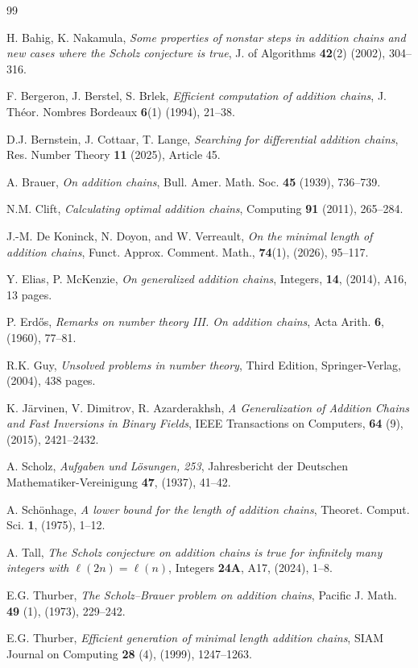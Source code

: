 \documentclass{article}
\theoremstyle{definition}
\begin{document}
\begin{thebibliography}{99}

 H. Bahig, K. Nakamula, {\sl Some properties of nonstar steps in addition chains and new cases where the Scholz conjecture is true}, J. of Algorithms {\bf 42}(2) (2002), 304--316.

F. Bergeron, J. Berstel, S. Brlek,
{\sl Efficient computation of addition chains},
J. Th\'eor. Nombres Bordeaux {\bf 6}(1) (1994), 21--38.

D.J. Bernstein, J. Cottaar, T. Lange,
{\sl Searching for differential addition chains},
Res. Number Theory {\bf 11} (2025), Article 45.

 A. Brauer, {\sl On addition chains}, Bull. Amer. Math. Soc. {\bf 45} (1939), 736--739.


 N.M. Clift, {\sl Calculating optimal addition chains}, Computing {\bf 91} (2011), 265--284.


 J.-M. De Koninck, N. Doyon, and W. Verreault, {\sl On the minimal length of addition chains}, Funct. Approx. Comment. Math., {\bf 74}(1), (2026), 95--117.


 Y. Elias, P. McKenzie, {\sl On generalized addition chains}, Integers, {\bf 14}, (2014), A16, 13 pages.


 P. Erd\H{o}s, {\sl Remarks on number theory III. On addition chains}, Acta Arith. {\bf 6}, (1960), 77--81.

 R.K. Guy, {\sl Unsolved problems in number theory}, Third Edition, Springer-Verlag, (2004), 438 pages.

 K. Järvinen, V. Dimitrov,  R. Azarderakhsh, {\sl A Generalization of Addition Chains and Fast Inversions in Binary Fields}, IEEE Transactions on Computers, {\bf 64} (9), (2015), 2421--2432.

 A. Scholz, {\sl Aufgaben und L\"osungen, 253}, Jahresbericht der Deutschen Mathematiker-Vereinigung {\bf 47}, (1937), 41--42.

 A. Sch\"onhage, {\sl A lower bound for the length of addition chains}, Theoret. Comput. Sci. {\bf 1}, (1975), 1--12.


 A. Tall, {\sl The Scholz conjecture on addition chains is true for infinitely many integers with $\ell(2n)=\ell(n)$}, Integers  {\bf 24A}, A17, (2024), 1--8.

 E.G. Thurber, {\sl The Scholz--Brauer problem on addition chains}, Pacific J. Math. {\bf 49} (1), (1973), 229--242.

 E.G. Thurber, {\sl Efficient generation of minimal length addition chains}, SIAM Journal on Computing {\bf 28} (4), (1999), 1247--1263.


\end{thebibliography}


\vfill
\noindent
\end{document}
